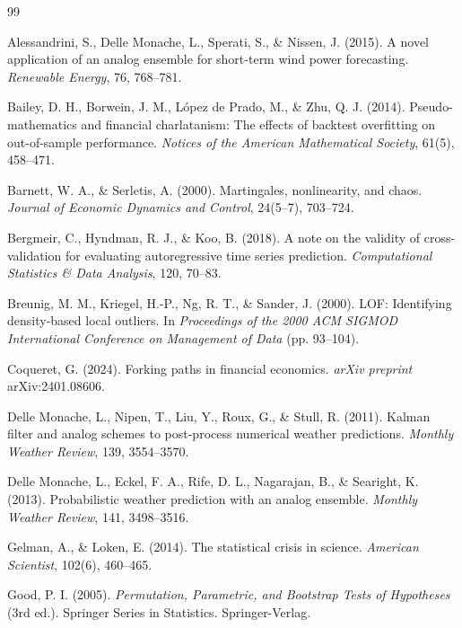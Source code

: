 \documentclass[preprint,12pt]{elsarticle}
\begin{document}
\newpage
\begin{thebibliography}{99}

 Alessandrini, S., Delle Monache, L., Sperati, S., \& Nissen, J. (2015). A novel application of an analog ensemble for short-term wind power forecasting. \emph{Renewable Energy}, 76, 768--781.

 Bailey, D. H., Borwein, J. M., L\'{o}pez de Prado, M., \& Zhu, Q. J. (2014). Pseudo-mathematics and financial charlatanism: The effects of backtest overfitting on out-of-sample performance. \emph{Notices of the American Mathematical Society}, 61(5), 458--471.

 Barnett, W. A., \& Serletis, A. (2000). Martingales, nonlinearity, and chaos. \emph{Journal of Economic Dynamics and Control}, 24(5--7), 703--724.

 Bergmeir, C., Hyndman, R. J., \& Koo, B. (2018). A note on the validity of cross-validation for evaluating autoregressive time series prediction. \emph{Computational Statistics \& Data Analysis}, 120, 70--83.

 Breunig, M. M., Kriegel, H.-P., Ng, R. T., \& Sander, J. (2000). LOF: Identifying density-based local outliers. In \emph{Proceedings of the 2000 ACM SIGMOD International Conference on Management of Data} (pp. 93--104).

 Coqueret, G. (2024). Forking paths in financial economics. \emph{arXiv preprint} arXiv:2401.08606.

 Delle Monache, L., Nipen, T., Liu, Y., Roux, G., \& Stull, R. (2011). Kalman filter and analog schemes to post-process numerical weather predictions. \emph{Monthly Weather Review}, 139, 3554--3570.

 Delle Monache, L., Eckel, F. A., Rife, D. L., Nagarajan, B., \& Searight, K. (2013). Probabilistic weather prediction with an analog ensemble. \emph{Monthly Weather Review}, 141, 3498--3516.

 Gelman, A., \& Loken, E. (2014). The statistical crisis in science. \emph{American Scientist}, 102(6), 460--465.

 Good, P. I. (2005). \emph{Permutation, Parametric, and Bootstrap Tests of Hypotheses} (3rd ed.). Springer Series in Statistics. Springer-Verlag.


\end{thebibliography}
\end{document}
